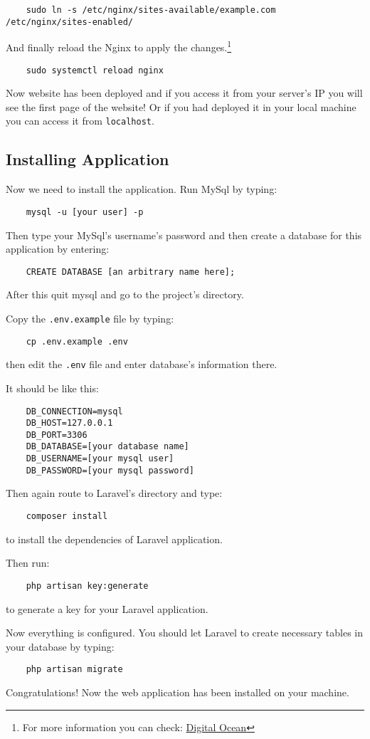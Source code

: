 \documentclass[12pt]{article}
\begin{document}
\begin{verbatim}
    sudo ln -s /etc/nginx/sites-available/example.com /etc/nginx/sites-enabled/
\end{verbatim}
And finally reload the Nginx to apply the changes.\footnote{For more information you can check: \href{https://www.digitalocean.com/community/tutorials/how-to-deploy-a-laravel-application-with-nginx-on-ubuntu-16-04\#step-5-\%E2\%80\%94-configuring-nginx}{Digital Ocean}}
\begin{verbatim}
    sudo systemctl reload nginx
\end{verbatim}
Now website has been deployed and if you access it from your server's IP you will see the first page of the website! Or if you had deployed it in your local machine you can access it from \verb|localhost|.

\subsection{Installing Application}
Now we need to install the application. Run MySql by typing:
\begin{verbatim}
    mysql -u [your user] -p
\end{verbatim}
Then type your MySql's username's password and then create a database for this application by entering:
\begin{verbatim}
    CREATE DATABASE [an arbitrary name here];
\end{verbatim}
After this quit mysql and go to the project's directory.

Copy the \verb|.env.example| file by typing:
\begin{verbatim}
    cp .env.example .env
\end{verbatim}
then edit the \verb|.env| file and enter database's information there.

It should be like this:
\begin{verbatim}
    DB_CONNECTION=mysql
    DB_HOST=127.0.0.1
    DB_PORT=3306
    DB_DATABASE=[your database name]
    DB_USERNAME=[your mysql user]
    DB_PASSWORD=[your mysql password]
\end{verbatim}
Then again route to Laravel's directory and type:
\begin{verbatim}
    composer install
\end{verbatim}
to install the dependencies of Laravel application.

Then run:
\begin{verbatim}
    php artisan key:generate
\end{verbatim}
to generate a key for your Laravel application.

Now everything is configured. You should let Laravel to create necessary tables in your database by typing:
\begin{verbatim}
    php artisan migrate
\end{verbatim}
Congratulations! Now the web application has been installed on your machine.
\end{document}
